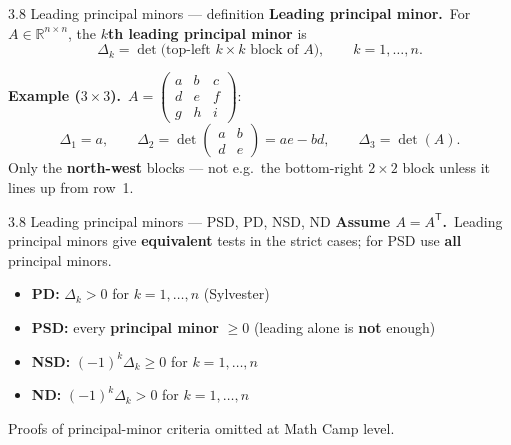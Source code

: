 \documentclass[11pt,aspectratio=169]{beamer}
\begin{document}
\begin{frame}{3.8 Leading principal minors --- definition}
  \footnotesize
  \textbf{Leading principal minor.}\
  For $A\in\mathbb{R}^{n\times n}$, the \textbf{$k$th leading principal minor} is
  \[
    \Delta_k=\det\bigl(\text{top-left }k\times k\text{ block of }A\bigr),
    \qquad k=1,\ldots,n.
  \]

  \medskip
  \textbf{Example ($3\times 3$).}\
  $A=
  \begin{pmatrix}a&b&c\\ d&e&f\\ g&h&i\end{pmatrix}$:
  \[
    \Delta_1=a,
    \qquad
    \Delta_2=\det\begin{pmatrix}a&b\\ d&e\end{pmatrix}=ae-bd,
    \qquad
    \Delta_3=\det(A).
  \]
  Only the \textbf{north-west} blocks --- not e.g.\ the bottom-right $2\times 2$ block unless it lines up from row~1.
\end{frame}

\begin{frame}{3.8 Leading principal minors --- PSD, PD, NSD, ND}
  \footnotesize
  \textbf{Assume $A=A^{\mathsf T}$.}\
  Leading principal minors give \textbf{equivalent} tests in the strict cases; for PSD use \textbf{all} principal minors.

  \medskip
  \begin{itemize}
    \item \textbf{PD:} $\Delta_k>0$ for $k=1,\ldots,n$ \quad (Sylvester)
    \item \textbf{PSD:} every \textbf{principal minor} $\ge 0$ (leading alone is \textbf{not} enough)
    \item \textbf{NSD:} $(-1)^k\Delta_k\ge 0$ for $k=1,\ldots,n$
    \item \textbf{ND:} $(-1)^k\Delta_k>0$ for $k=1,\ldots,n$
  \end{itemize}

  \medskip
  {\scriptsize Proofs of principal-minor criteria omitted at Math Camp level.}
\end{frame}
\end{document}
